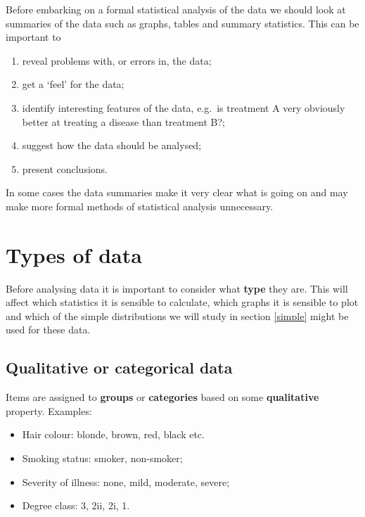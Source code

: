 \documentclass[
  british,
]{book}
\providecommand{\tightlist}{%
  \setlength{\itemsep}{0pt}\setlength{\parskip}{0pt}}
\begin{document}
Before embarking on a formal statistical analysis of the data we should look at summaries of the data such as graphs, tables and summary statistics. This can be important to

\begin{enumerate}
\def\labelenumi{\arabic{enumi}.}
\tightlist
\item
  reveal problems with, or errors in, the data;
\item
  get a `feel' for the data;
\item
  identify interesting features of the data, e.g.~is treatment A very
  obviously better at treating a disease than treatment B?;
\item
  suggest how the data should be analysed;
\item
  present conclusions.
\end{enumerate}

In some cases the data summaries make it very clear what is going on and may
make more formal methods of statistical analysis unnecessary.

\hypertarget{types-of-data}{%
\section{Types of data}\label{types-of-data}}

Before analysing data it is important to consider what \textbf{type} they are. This will affect which statistics it is sensible to calculate, which graphs it is sensible to plot and which of the simple distributions we will study in section \ref{simple} might be used for these data.

\hypertarget{qualitative-or-categorical-data}{%
\subsection{Qualitative or categorical data}\label{qualitative-or-categorical-data}}

Items are assigned to \textbf{groups} or \textbf{categories} based on some \textbf{qualitative} property. Examples:

\begin{itemize}
\tightlist
\item
  Hair colour: blonde, brown, red, black etc.
\item
  Smoking status: smoker, non-smoker;
\item
  Severity of illness: none, mild, moderate, severe;
\item
  Degree class: 3, 2ii, 2i, 1.
\end{itemize}
\end{document}
